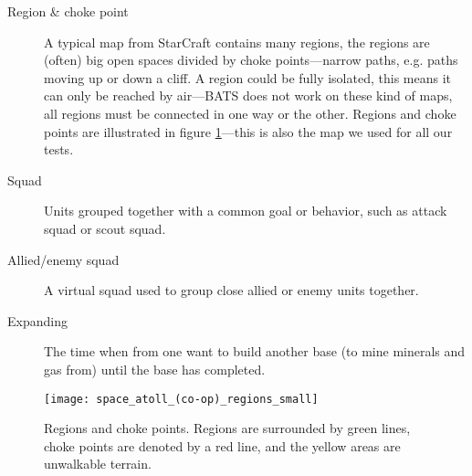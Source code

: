 \begin{description}
	\item[Region \& choke point] A typical map from StarCraft contains many regions, the regions are (often) big open spaces divided by choke points—narrow paths, e.g. paths moving up or down a cliff. A region could be fully isolated, this means it can only be reached by air—BATS does not work on these kind of maps, all regions must be connected in one way or the other. Regions and choke points are illustrated in figure \ref{fig:region_and_choke_points}—this is also the map we used for all our tests.
	\item[Squad] Units grouped together with a common goal or behavior, such as attack squad or scout squad.
	\item[Allied/enemy squad] A virtual squad used to group close allied or enemy units together.
	\item[Expanding] The time when from one want to build another base (to mine minerals and gas from) until the base has completed.
\end{description}
\begin{figure}[htb]
	\centering
	\texttt{[image: space\_atoll\_(co-op)\_regions\_small]}
	\caption[Regions and choke points]{Regions and choke points. Regions are surrounded by green lines, choke points are denoted by a red line, and the yellow areas are unwalkable terrain.}
	\label{fig:region_and_choke_points}
\end{figure}